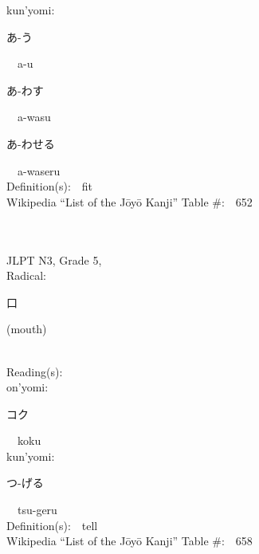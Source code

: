 \begin{multicols}{2}
{\hspace*{1em}}kun'yomi:\ \ \\
{\hspace*{2em}}{\begin{CJK}{UTF8}{min} あ-う \end{CJK}}\ \ a-u\ \ \\
{\hspace*{2em}}{\begin{CJK}{UTF8}{min} あ-わす \end{CJK}}\ \ a-wasu\ \ \\
{\hspace*{2em}}{\begin{CJK}{UTF8}{min} あ-わせる \end{CJK}}\ \ a-waseru\ \ \\
Definition(s):\ \ fit \\
Wikipedia ``List of the J\=oy\=o Kanji'' Table \#:\ \ 652 \\
\ \ \\
{\fontsize{34pt}{40pt}  }\ \ \\  %
{JLPT N3, Grade 5, \\Radical:\ \ {\begin{CJK}{UTF8}{min} 口 \end{CJK}} (mouth) } \\
Reading(s):\ \ \\
{\hspace*{1em}}on'yomi:\ \ \\
{\hspace*{2em}}{\begin{CJK}{UTF8}{min} コク \end{CJK}}\ \ koku\ \ \\
{\hspace*{1em}}kun'yomi:\ \ \\
{\hspace*{2em}}{\begin{CJK}{UTF8}{min} つ-げる \end{CJK}}\ \ tsu-geru\ \ \\
Definition(s):\ \ tell \\
Wikipedia ``List of the J\=oy\=o Kanji'' Table \#:\ \ 658 \\
\ \ \\
{\fontsize{34pt}{40pt}  }\ \ \\  %

\end{multicols}

